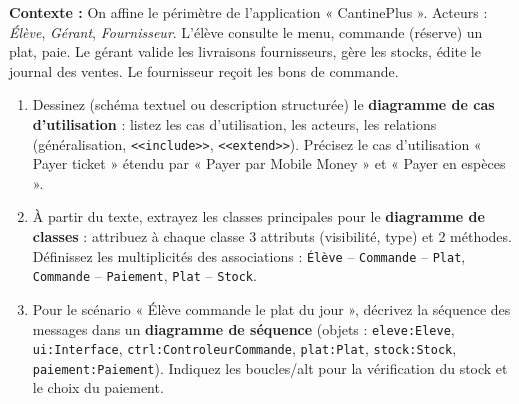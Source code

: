\documentclass[11pt]{article}
\begin{document}
\begin{exercice}
\textbf{Contexte :} On affine le périmètre de l'application « CantinePlus ». Acteurs : \textit{Élève}, \textit{Gérant}, \textit{Fournisseur}. L'élève consulte le menu, commande (réserve) un plat, paie. Le gérant valide les livraisons fournisseurs, gère les stocks, édite le journal des ventes. Le fournisseur reçoit les bons de commande.
\begin{enumerate}
    \item Dessinez (schéma textuel ou description structurée) le \textbf{diagramme de cas d'utilisation} : listez les cas d'utilisation, les acteurs, les relations (généralisation, \texttt{<<include>>}, \texttt{<<extend>>}). Précisez le cas d'utilisation « Payer ticket » étendu par « Payer par Mobile Money » et « Payer en espèces ».
    \item À partir du texte, extrayez les classes principales pour le \textbf{diagramme de classes} : attribuez à chaque classe 3 attributs (visibilité, type) et 2 méthodes. Définissez les multiplicités des associations : \texttt{Élève} -- \texttt{Commande} -- \texttt{Plat}, \texttt{Commande} -- \texttt{Paiement}, \texttt{Plat} -- \texttt{Stock}.
    \item Pour le scénario « Élève commande le plat du jour », décrivez la séquence des messages dans un \textbf{diagramme de séquence} (objets : \texttt{eleve:Eleve}, \texttt{ui:Interface}, \texttt{ctrl:ControleurCommande}, \texttt{plat:Plat}, \texttt{stock:Stock}, \texttt{paiement:Paiement}). Indiquez les boucles/alt pour la vérification du stock et le choix du paiement.
\end{enumerate}
\end{exercice}
\end{document}
